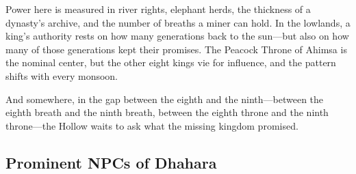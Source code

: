 Power here is measured in river rights, elephant herds, the thickness of a dynasty's archive, and the number of breaths a miner can hold. In the lowlands, a king's authority rests on how many generations back to the sun---but also on how many of those generations kept their promises. The Peacock Throne of Ahimsa is the nominal center, but the other eight kings vie for influence, and the pattern shifts with every monsoon.

And somewhere, in the gap between the eighth and the ninth---between the eighth breath and the ninth breath, between the eighth throne and the ninth throne---the Hollow waits to ask what the missing kingdom promised.

\subsection*{Prominent NPCs of Dhahara}
\label{sec:dhahara-npcs}


